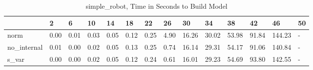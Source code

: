 \begin{table}
\caption{simple_robot, Time in Seconds to Build Model}
\label{simple_robot_model_time}
\begin{tabular}{llllllllllllll}
\toprule
 & 2 & 6 & 10 & 14 & 18 & 22 & 26 & 30 & 34 & 38 & 42 & 46 & 50 \\
\midrule
norm & 0.00 & 0.01 & 0.03 & 0.05 & 0.12 & 0.25 & 4.90 & 16.26 & 30.02 & 53.98 & 91.84 & 144.23 & - \\
no_internal & 0.01 & 0.00 & 0.02 & 0.05 & 0.13 & 0.25 & 0.74 & 16.14 & 29.31 & 54.17 & 91.06 & 140.84 & - \\
s_var & 0.00 & 0.00 & 0.02 & 0.05 & 0.12 & 0.24 & 0.61 & 16.01 & 29.23 & 54.69 & 93.80 & 142.55 & - \\
\bottomrule
\end{tabular}
\end{table}
